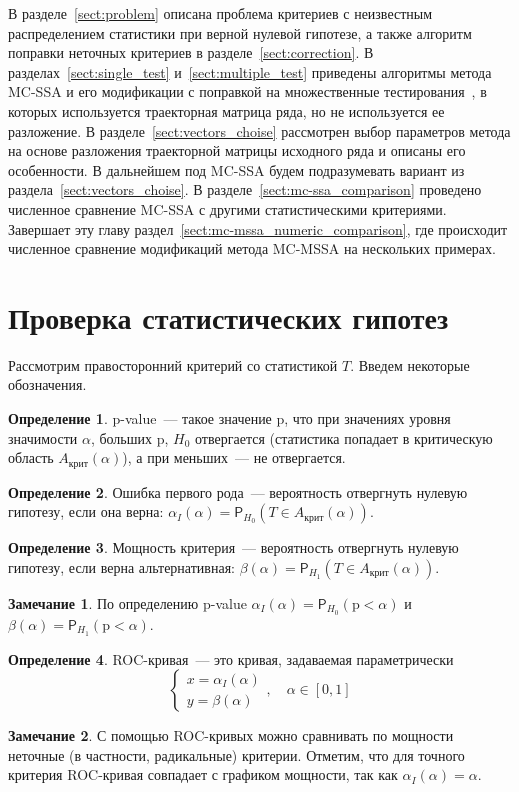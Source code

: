 \documentclass[specialist,
substylefile = spbu.rtx,
               subf,href,colorlinks=true, 12pt]{disser}
\theoremstyle{definition}
\newtheorem{definition}{Определение}
\newtheorem{remark}{Замечание}
\begin{document}
В разделе~\ref{sect:problem} описана проблема критериев с неизвестным распределением статистики при верной нулевой гипотезе, а также алгоритм поправки неточных критериев в разделе~\ref{sect:correction}. В разделах~\ref{sect:single_test} и~\ref{sect:multiple_test} приведены алгоритмы метода MC-SSA и его модификации с поправкой на множественные тестирования~\cite{Golyandina2023}, в которых используется траекторная матрица ряда, но не используется ее разложение. В разделе~\ref{sect:vectors_choise} рассмотрен выбор параметров метода на основе разложения траекторной матрицы исходного ряда и описаны его особенности. В дальнейшем под MC-SSA будем подразумевать вариант из раздела~\ref{sect:vectors_choise}. В разделе~\ref{sect:mc-ssa_comparison} проведено численное сравнение MC-SSA с другими статистическими критериями. Завершает эту главу раздел~\ref{sect:mc-mssa_numeric_comparison}, где происходит численное сравнение модификаций метода MC-MSSA на нескольких примерах.

\section{Проверка статистических гипотез}\label{sect:hypothesis}
Рассмотрим правосторонний критерий со статистикой $T$. Введем некоторые обозначения.
\begin{definition}
	p-value~--- такое значение $\mathrm p$, что при значениях уровня значимости $\alpha$, больших $\mathrm p$, $H_0$ отвергается (статистика попадает в критическую область $A_\text{крит}(\alpha)$), а при меньших~--- не отвергается.
\end{definition}
\begin{definition}
	Ошибка первого рода~--- вероятность отвергнуть нулевую гипотезу, если она верна: $\alpha_I(\alpha)=\mathsf P_{H_0}(T\in A_\text{крит}(\alpha))$.
\end{definition}
\begin{definition}
	Мощность критерия~--- вероятность отвергнуть нулевую гипотезу, если верна альтернативная: $\beta(\alpha)=\mathsf P_{H_1}(T\in A_\text{крит}(\alpha))$.
\end{definition}
\begin{remark}
	По определению p-value $\alpha_I(\alpha)=\mathsf P_{H_0}(\mathrm p < \alpha)$ и $\beta(\alpha)=\mathsf P_{H_1}(\mathrm p < \alpha)$.
\end{remark}
\begin{definition}
	ROC-кривая~--- это кривая, задаваемая параметрически
	\[
		\begin{cases}
			x=\alpha_I(\alpha) \\
			y=\beta(\alpha)
		\end{cases},\quad \alpha\in[0,1]
	\]
\end{definition}
\begin{remark}
	С помощью ROC-кривых можно сравнивать по мощности неточные (в частности, радикальные) критерии. Отметим, что для точного критерия ROC-кривая совпадает с графиком мощности, так как $\alpha_I(\alpha)=\alpha$.
\end{remark}
\end{document}
